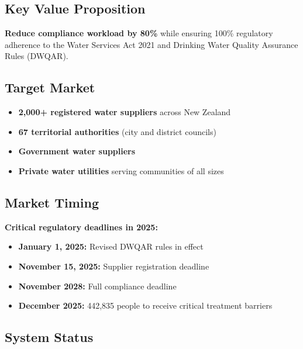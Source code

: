 \documentclass[11pt,a4paper]{article}
\begin{document}
\subsection*{Key Value Proposition}

\begin{highlightbox}
    \textbf{Reduce compliance workload by 80\%} while ensuring 100\% regulatory adherence to the Water Services Act 2021 and Drinking Water Quality Assurance Rules (DWQAR).
\end{highlightbox}

\subsection*{Target Market}

\begin{itemize}[leftmargin=*, itemsep=0.5em]
    \item \textbf{2,000+ registered water suppliers} across New Zealand
    \item \textbf{67 territorial authorities} (city and district councils)
    \item \textbf{Government water suppliers}
    \item \textbf{Private water utilities} serving communities of all sizes
\end{itemize}

\subsection*{Market Timing}

\textcolor{warningorange}{\textbf{Critical regulatory deadlines in 2025:}}

\begin{itemize}[leftmargin=*, itemsep=0.3em]
    \item \textbf{January 1, 2025:} Revised DWQAR rules in effect
    \item \textbf{November 15, 2025:} Supplier registration deadline
    \item \textbf{November 2028:} Full compliance deadline
    \item \textbf{December 2025:} 442,835 people to receive critical treatment barriers
\end{itemize}

\subsection*{System Status}
\end{document}
